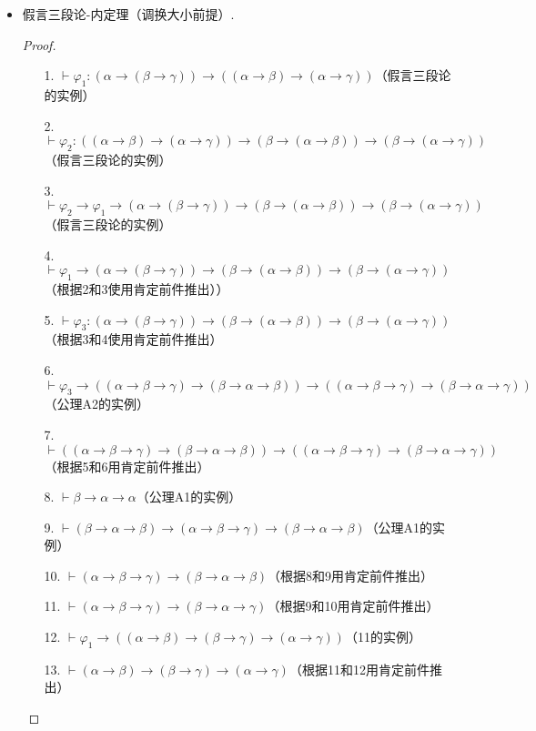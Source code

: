 \documentclass[main.tex]{subfiles}
\begin{document}
\begin{itemize}
    \item 假言三段论-内定理（调换大小前提）. 
    \begin{proof}
        \begin{itemize}
            \item [1.] \(\vdash \varphi_1: (\alpha \to (\beta \to \gamma)) \to ((\alpha \to \beta) \to (\alpha \to \gamma))\)（假言三段论的实例）
            \item [2.] \(\vdash \varphi_2: ((\alpha \to \beta) \to (\alpha \to \gamma)) \to (\beta \to (\alpha \to \beta)) \to (\beta \to (\alpha \to \gamma))\)（假言三段论的实例）
            \item [3.] \(\vdash \varphi_2 \to \varphi_1 \to (\alpha \to (\beta \to \gamma)) \to (\beta \to (\alpha \to \beta)) \to (\beta \to (\alpha \to \gamma))\)（假言三段论的实例）
            \item [4.] \(\vdash \varphi_1 \to (\alpha \to (\beta \to \gamma)) \to (\beta \to (\alpha \to \beta)) \to (\beta \to (\alpha \to \gamma))\)（根据2和3使用肯定前件推出））
            \item [5.] \(\vdash \varphi_3: (\alpha \to (\beta \to \gamma)) \to (\beta \to (\alpha \to \beta)) \to (\beta \to (\alpha \to \gamma))\)（根据3和4使用肯定前件推出）
            \item [6.] \(\vdash \varphi_3 \to ((\alpha \to \beta \to \gamma) \to (\beta \to \alpha \to \beta)) \to ((\alpha \to \beta \to \gamma) \to (\beta \to \alpha \to \gamma))\)（公理A2的实例）
            \item [7.] \(\vdash ((\alpha \to \beta \to \gamma) \to (\beta \to \alpha \to \beta)) \to ((\alpha \to \beta \to \gamma) \to (\beta \to \alpha \to \gamma))\)（根据5和6用肯定前件推出）
            \item [8.] \(\vdash \beta \to \alpha \to \alpha\)（公理A1的实例）
            \item [9.] \(\vdash (\beta \to \alpha \to \beta) \to (\alpha \to \beta \to \gamma) \to (\beta \to \alpha \to \beta)\)（公理A1的实例）
            \item [10.] \(\vdash (\alpha \to \beta \to \gamma) \to (\beta \to \alpha \to \beta)\)（根据8和9用肯定前件推出）
            \item [11.] \(\vdash (\alpha \to \beta \to \gamma) \to (\beta \to \alpha \to \gamma)\)（根据9和10用肯定前件推出）
            \item [12.] \(\vdash \varphi_1 \to ((\alpha \to \beta) \to (\beta \to \gamma) \to (\alpha \to \gamma))\)（11的实例）
            \item [13.] \(\vdash (\alpha \to \beta) \to (\beta \to \gamma) \to (\alpha \to \gamma)\)（根据11和12用肯定前件推出）
        \end{itemize}
    \end{proof}


\end{itemize}
\end{document}
